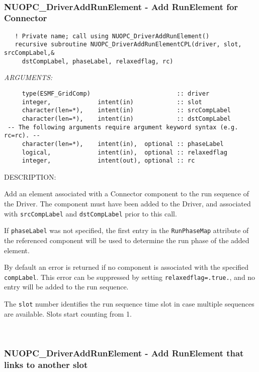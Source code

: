 \mbox{}\hrulefill\ 
 
\subsubsection [NUOPC\_DriverAddRunElement] {NUOPC\_DriverAddRunElement - Add RunElement for Connector}


  
\begin{verbatim}   ! Private name; call using NUOPC_DriverAddRunElement()
   recursive subroutine NUOPC_DriverAddRunElementCPL(driver, slot, srcCompLabel,&
     dstCompLabel, phaseLabel, relaxedflag, rc)\end{verbatim}{\em ARGUMENTS:}
\begin{verbatim}     type(ESMF_GridComp)                        :: driver
     integer,             intent(in)            :: slot
     character(len=*),    intent(in)            :: srcCompLabel
     character(len=*),    intent(in)            :: dstCompLabel
 -- The following arguments require argument keyword syntax (e.g. rc=rc). --
     character(len=*),    intent(in),  optional :: phaseLabel
     logical,             intent(in),  optional :: relaxedflag
     integer,             intent(out), optional :: rc \end{verbatim}
{\sf DESCRIPTION:\\ }


   Add an element associated with a Connector component to the
   run sequence of the Driver. The component must have been added to the Driver,
   and associated with {\tt srcCompLabel} and {\tt dstCompLabel} prior to this
   call.
  
   If {\tt phaseLabel} was not specified, the first entry in the
   {\tt RunPhaseMap} attribute of the referenced component will be used to 
   determine the run phase of the added element.
  
   By default an error is returned if no component is associated with the 
   specified {\tt compLabel}. This error can be suppressed by setting
   {\tt relaxedflag=.true.}, and no entry will be added to the run sequence.
  
   The {\tt slot} number identifies the run sequence time slot in case multiple
   sequences are available. Slots start counting from 1. 
 
\mbox{}\hrulefill\ 
 
\subsubsection [NUOPC\_DriverAddRunElement] {NUOPC\_DriverAddRunElement - Add RunElement that links to another slot}



